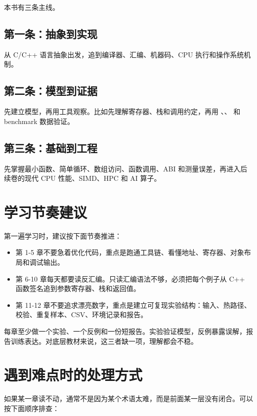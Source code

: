 本书有三条主线。

\subsection*{第一条：抽象到实现}

从 C/C++ 语言抽象出发，追到编译器、汇编、机器码、CPU 执行和操作系统机制。

\subsection*{第二条：模型到证据}

先建立模型，再用工具观察。比如先理解寄存器、栈和调用约定，再用 、、 和 benchmark 数据验证。

\subsection*{第三条：基础到工程}

先掌握最小函数、简单循环、数组访问、函数调用、ABI 和测量误差，再进入后续卷的现代 CPU 性能、SIMD、HPC 和 AI 算子。

\section*{学习节奏建议}

第一遍学习时，建议按下面节奏推进：

\begin{itemize}
  \item 第 1-5 章不要急着优化代码，重点是跑通工具链、看懂地址、寄存器、对象布局和调试输出。
  \item 第 6-10 章每天都要读反汇编。只读汇编语法不够，必须把每个例子从 C++ 函数签名追到参数寄存器、栈和返回值。
  \item 第 11-12 章不要追求漂亮数字，重点是建立可复现实验结构：输入、热路径、校验、重复样本、CSV、环境记录和报告。
\end{itemize}

每章至少做一个实验、一个反例和一份短报告。实验验证模型，反例暴露误解，报告训练表达。对底层教材来说，这三者缺一项，理解都会不稳。

\section*{遇到难点时的处理方式}

如果某一章读不动，通常不是因为某个术语太难，而是前面某一层没有闭合。可以按下面顺序排查：

